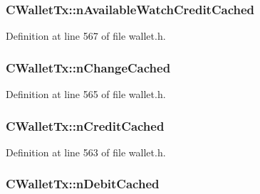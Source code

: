 \subsubsection[{n\+Available\+Watch\+Credit\+Cached}]{ C\+Wallet\+Tx\+::n\+Available\+Watch\+Credit\+Cached\hspace{0.3cm}{\ttfamily [mutable]}}\label{class_c_wallet_tx_ab3113c0543c6f68ccbb2449dde29aec7}


Definition at line 567 of file wallet.\+h.

\hypertarget{class_c_wallet_tx_af324c0c303c44aea9c790e782187343e}{}
\subsubsection[{n\+Change\+Cached}]{ C\+Wallet\+Tx\+::n\+Change\+Cached\hspace{0.3cm}{\ttfamily [mutable]}}\label{class_c_wallet_tx_af324c0c303c44aea9c790e782187343e}


Definition at line 565 of file wallet.\+h.

\hypertarget{class_c_wallet_tx_a6f6b791fc148e3ce053e229f8fe83496}{}
\subsubsection[{n\+Credit\+Cached}]{ C\+Wallet\+Tx\+::n\+Credit\+Cached\hspace{0.3cm}{\ttfamily [mutable]}}\label{class_c_wallet_tx_a6f6b791fc148e3ce053e229f8fe83496}


Definition at line 563 of file wallet.\+h.

\hypertarget{class_c_wallet_tx_aafed9b6aeecef4f9159ee73a8d69262d}{}
\subsubsection[{n\+Debit\+Cached}]{ C\+Wallet\+Tx\+::n\+Debit\+Cached\hspace{0.3cm}{\ttfamily [mutable]}}\label{class_c_wallet_tx_aafed9b6aeecef4f9159ee73a8d69262d}


